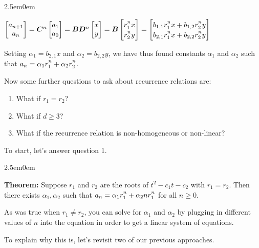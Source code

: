 \documentclass{book}
\newcommand{\hOne}{%
   \color{Black}%
   \fontsize{14}{16}\selectfont%
}
\newcommand{\hTwo}{%
\color{MidnightBlue}%
   \fontsize{13}{15}\selectfont%
}
\newenvironment{myIndent}{%
   \begin{adjustwidth}{2.5em}{0em}%
}{%
   \end{adjustwidth}%
}
\newcommand{\blab}[1]{\textbf{#1}}
\newcommand{\retTwo}{\hfill\bigbreak}
\begin{document}
\begin{myIndent}
   {\center $\begin{bmatrix}
      a_{n+1} \\ a_n
   \end{bmatrix} =
   \bm{C}^n\begin{bmatrix}
      a_1 \\ a_0
   \end{bmatrix} = \bm{B}\bm{D}^n\begin{bmatrix}
      x \\ y
   \end{bmatrix} = \bm{B}\begin{bmatrix}
      r_1^{\vphantom{|}n}x \\ r_2^{\vphantom{|}n}y
   \end{bmatrix} = \begin{bmatrix}
     b_{1,1} r_1^{\vphantom{|}n}x + b_{1,2}r_2^{\vphantom{|}n}y \\ b_{2,1} r_1^{\vphantom{|}n}x + b_{2,2}r_2^{\vphantom{|}n}y
   \end{bmatrix}$ \retTwo\par}

   Setting $\alpha_1 = b_{2,1}x$ and $\alpha_2 = b_{2,2}y$, we have thus found constants $\alpha_1$ and $\alpha_2$ such that $a_n = \alpha_1r_1^{\vphantom{|}n} + \alpha_2r_2^{\vphantom{|}n}$.\retTwo\retTwo
\end{myIndent}

\hOne
Now some further questions to ask about recurrence relations are:
\begin{enumerate}
   \item What if $r_1 = r_2$?
   \item What if $d \geq 3$?
   \item What if the recurrence relation is non-homogeneous or non-linear?\retTwo
\end{enumerate}

To start, let's answer question 1.
\begin{myIndent}\hTwo
   \blab{Theorem:} Suppose $r_1$ and $r_2$ are the roots of $t^2 - c_1t - c_2$ with $r_1 = r_2$. Then there exists $\alpha_1, \alpha_2$ such that $a_n = \alpha_1r_1^{\vphantom{|}n} + \alpha_2 n r_1^{\vphantom{|}n}$ for all $n \geq 0$.\retTwo

   As was true when $r_1 \neq r_2$, you can solve for $\alpha_1$ and $\alpha_2$ by plugging in different values of $n$ into the equation in order to get a linear system of equations.\retTwo
\end{myIndent}

To explain why this is, let's revisit two of our previous approaches.\retTwo
\end{document}
